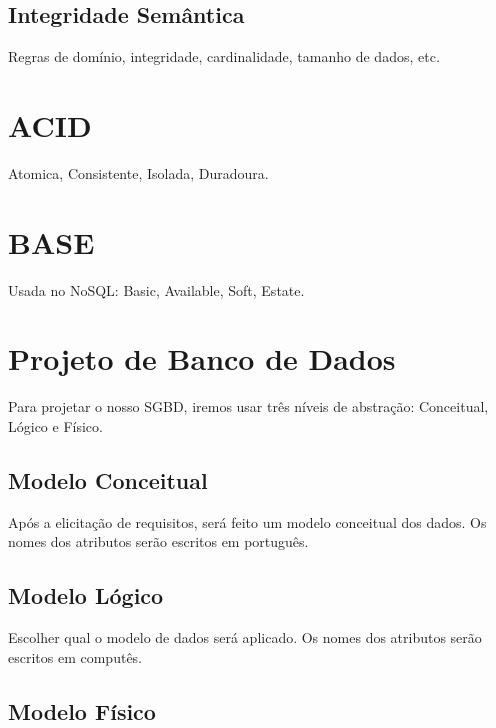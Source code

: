 \documentclass[ ]{article}
\begin{document}
		\subsection{Integridade Semântica}
			Regras de domínio, integridade, cardinalidade, tamanho de dados, etc. 
	\section{ACID}
		Atomica, Consistente, Isolada, Duradoura.
	\section{BASE}
		Usada no NoSQL: Basic, Available, Soft, Estate.
	\section{Projeto de Banco de Dados}
		Para projetar o nosso SGBD, iremos usar três níveis de abstração: Conceitual, Lógico e Físico.
		\subsection{Modelo Conceitual}
			Após a elicitação de requisitos, será feito um modelo conceitual dos dados. Os nomes dos atributos serão escritos em português.
		\subsection{Modelo Lógico}
			Escolher qual o modelo de dados  será aplicado. Os nomes dos atributos serão escritos em computês.
		\subsection{Modelo Físico}
			
\end{document}
